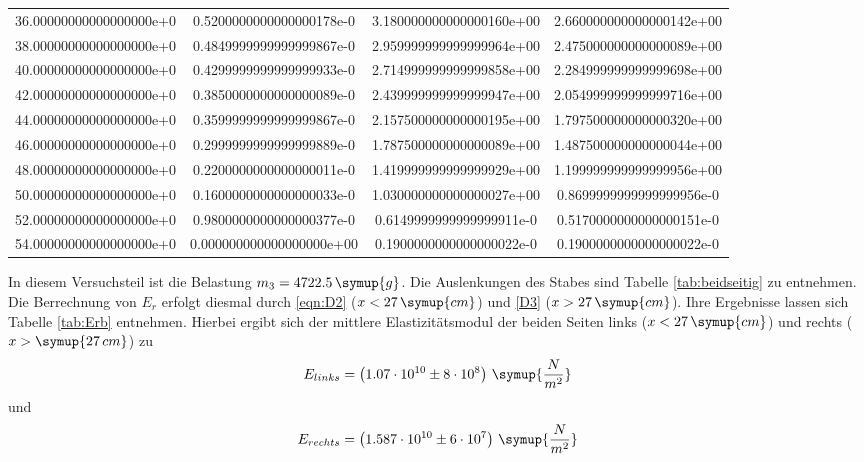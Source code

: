 \begin{table}
\begin{tabular}{S S S S}
    36.00000000000000000e+0 & 0.5200000000000000178e-0 & 3.180000000000000160e+00 & 2.660000000000000142e+00\\
    38.00000000000000000e+0 & 0.4849999999999999867e-0 & 2.959999999999999964e+00 & 2.475000000000000089e+00\\
    40.00000000000000000e+0 & 0.4299999999999999933e-0 & 2.714999999999999858e+00 & 2.284999999999999698e+00\\
    42.00000000000000000e+0 & 0.3850000000000000089e-0 & 2.439999999999999947e+00 & 2.054999999999999716e+00\\
    44.00000000000000000e+0 & 0.3599999999999999867e-0 & 2.157500000000000195e+00 & 1.797500000000000320e+00\\
    46.00000000000000000e+0 & 0.2999999999999999889e-0 & 1.787500000000000089e+00 & 1.487500000000000044e+00\\
    48.00000000000000000e+0 & 0.2200000000000000011e-0 & 1.419999999999999929e+00 & 1.199999999999999956e+00\\
    50.00000000000000000e+0 & 0.1600000000000000033e-0 & 1.030000000000000027e+00 & 0.8699999999999999956e-0\\
    52.00000000000000000e+0 & 0.9800000000000000377e-0 & 0.6149999999999999911e-0 & 0.5170000000000000151e-0\\
    54.00000000000000000e+0 & 0.000000000000000000e+00 & 0.1900000000000000022e-0 & 0.1900000000000000022e-0\\
    \bottomrule
  \end{tabular}
\end{table}

In diesem Versuchsteil ist die Belastung $m_3 = 4722.5 \, \symup{g}$. Die Auslenkungen des Stabes sind Tabelle \ref{tab:beidseitig} zu entnehmen. Die Berrechnung von $E_r$ erfolgt diesmal durch \eqref{eqn:D2} ($x<27 \, \symup{cm}$) und \eqref{D3} ($x>27 \, \symup{cm}$). Ihre Ergebnisse lassen sich Tabelle \ref{tab:Erb} entnehmen. Hierbei ergibt sich der mittlere Elastizitätsmodul der beiden Seiten links ($x<27 \, \symup{cm}$) und rechts ($x> \symup{27 \,cm}$) zu
\begin{equation*}
  E_{links} = \left(1.07\cdot 10^{10} \pm 8\cdot 10^{8} \right) \, \symup{\frac{N}{m^2}}
\end{equation*}
und
\begin{equation*}
  E_{rechts} = \left(1.587\cdot 10^{10} \pm 6\cdot 10^{7} \right) \, \symup{\frac{N}{m^2}}
\end{equation*}

